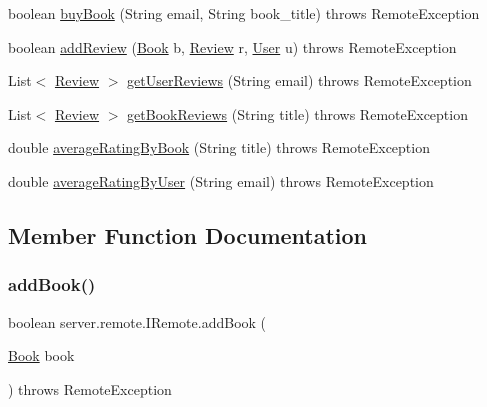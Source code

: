 \begin{DoxyCompactItemize}
\item 
boolean \hyperlink{interfaceserver_1_1remote_1_1_i_remote_a5ecb918e7d2650346770f3ff5676c25b}{buy\+Book} (String email, String book\+\_\+title)  throws Remote\+Exception
\item 
boolean \hyperlink{interfaceserver_1_1remote_1_1_i_remote_ab24486281e8c228ee82a48a5ca70297b}{add\+Review} (\hyperlink{classserver_1_1data_1_1_book}{Book} b, \hyperlink{classserver_1_1data_1_1_review}{Review} r, \hyperlink{classserver_1_1data_1_1_user}{User} u)  throws Remote\+Exception
\item 
List$<$ \hyperlink{classserver_1_1data_1_1_review}{Review} $>$ \hyperlink{interfaceserver_1_1remote_1_1_i_remote_a9e52d282ba2386018ebd6817459a743f}{get\+User\+Reviews} (String email)  throws Remote\+Exception
\item 
List$<$ \hyperlink{classserver_1_1data_1_1_review}{Review} $>$ \hyperlink{interfaceserver_1_1remote_1_1_i_remote_a600254593b70d9757190475d3435b390}{get\+Book\+Reviews} (String title)  throws Remote\+Exception
\item 
double \hyperlink{interfaceserver_1_1remote_1_1_i_remote_a4a53942c94debc835f1817b2753722de}{average\+Rating\+By\+Book} (String title)  throws Remote\+Exception
\item 
double \hyperlink{interfaceserver_1_1remote_1_1_i_remote_a11c915f0c22728be1898d46a78ac92cf}{average\+Rating\+By\+User} (String email)  throws Remote\+Exception
\end{DoxyCompactItemize}


\subsection{Member Function Documentation}
\mbox{\label{interfaceserver_1_1remote_1_1_i_remote_a3b11a0e182873e445ec8546394e36373}} 
\subsubsection{\texorpdfstring{add\+Book()}{addBook()}}
{\footnotesize\ttfamily boolean server.\+remote.\+I\+Remote.\+add\+Book (\begin{DoxyParamCaption}\item[{\hyperlink{classserver_1_1data_1_1_book}{Book}}]{book }\end{DoxyParamCaption}) throws Remote\+Exception}



